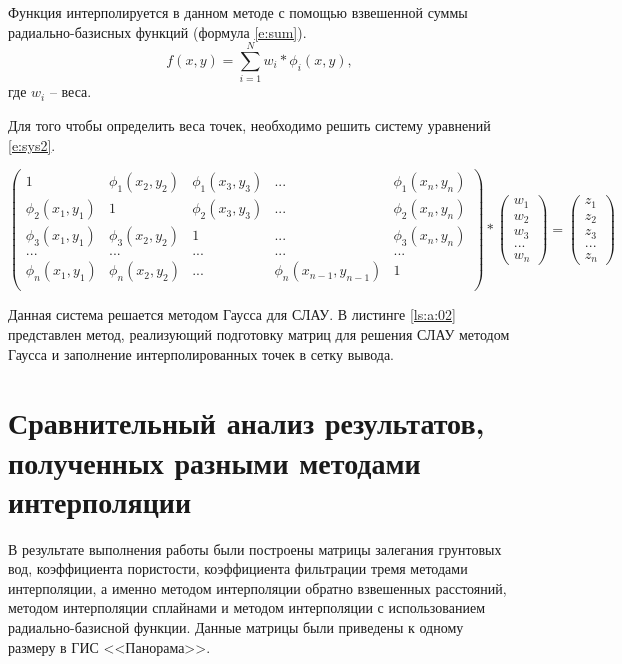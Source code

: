 Функция интерполируется в данном методе с помощью взвешенной суммы радиально-базисных функций (формула \ref{e:sum}). 
\begin{equation} \label{e:sum}
f(x, y) = \sum ^N _{i=1} w_i*\phi_i(x,y) ,
\end{equation}
где $w_i$ -- веса.

Для того чтобы определить веса точек, необходимо решить систему уравнений \ref{e:sys2}. 
\begin{small}
\begin{equation} \label{e:sys2}
\begin{pmatrix}
1 & \phi_1(x_2, y_2) & \phi_1(x_3, y_3) & ... & \phi_1(x_n, y_n)\\ 
\phi_2(x_1, y_1) & 1 & \phi_2(x_3, y_3) & ... & \phi_2(x_n, y_n)\\ 
\phi_3(x_1, y_1) & \phi_3(x_2, y_2) & 1 & ... & \phi_3(x_n, y_n)\\ 
... & ... & ... & ... & ... \\ 
\phi_n(x_1, y_1) & \phi_n(x_2, y_2) & ... &  \phi_n(x_{n-1}, y_{n-1}) &  1\\ 
\end{pmatrix} * \begin{pmatrix}
w_1\\ 
w_2\\ 
w_3\\ 
...\\ 
w_n
\end{pmatrix} = \begin{pmatrix}
z_1\\ 
z_2\\ 
z_3\\ 
...\\ 
z_n
\end{pmatrix}
\end{equation}
\end{small}
Данная система решается методом Гаусса для СЛАУ. В листинге \ref{ls:a:02} представлен метод, реализующий подготовку матриц для решения СЛАУ методом Гаусса и заполнение интерполированных точек в сетку вывода.

\section{Сравнительный анализ результатов, полученных разными методами интерполяции}

В результате выполнения работы были построены матрицы залегания грунтовых вод, коэффициента пористости, коэффициента фильтрации тремя методами интерполяции, а именно методом интерполяции обратно взвешенных расстояний, методом интерполяции сплайнами и  методом интерполяции с использованием радиально-базисной функции. Данные матрицы были приведены к одному размеру в ГИС <<Панорама>>.

